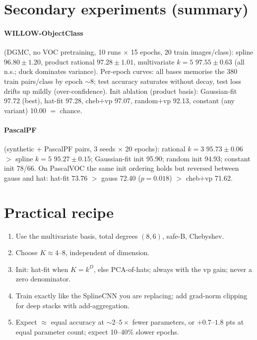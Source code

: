 \documentclass[11pt]{article}
\begin{document}
\section{Secondary experiments (summary)}
\label{sec:secondary}

\paragraph{WILLOW-ObjectClass} (DGMC, no VOC pretraining, 10 runs $\times$
15 epochs, 20 train images/class): spline $96.80 \pm 1.20$, product rational
$97.28 \pm 1.01$, multivariate $k{=}5$ $97.55 \pm 0.63$ (all n.s.; duck
dominates variance). Per-epoch curves: all bases memorise the 380 train
pairs/class by epoch ${\sim}8$; test accuracy saturates without decay, test
loss drifts up mildly (over-confidence). Init ablation (product basis):
Gaussian-fit 97.72 (best), hat-fit 97.28, cheb$+$vp 97.07, random$+$vp
92.13, constant (any variant) 10.00 $=$ chance.

\paragraph{PascalPF} (synthetic $+$ PascalPF pairs, 3 seeds $\times$ 20
epochs): rational $k{=}3$ $95.73 \pm 0.06$ $>$ spline $k{=}5$
$95.27 \pm 0.15$; Gaussian-fit init 95.90; random init 94.93; constant init
78/66. On PascalVOC the same init ordering holds but reversed between gauss
and hat: hat-fit 73.76 $>$ gauss 72.40 ($p=0.018$) $>$ cheb$+$vp 71.62.

\section{Practical recipe}
\label{sec:recipe}

\begin{enumerate}
\item Use the multivariate basis, total degrees $(8,6)$, safe-B, Chebyshev.
\item Choose $K \approx 4$--$8$, independent of dimension.
\item Init: hat-fit when $K=k^D$, else PCA-of-hats; always with the vp gain;
  never a zero denominator.
\item Train exactly like the SplineCNN you are replacing; add grad-norm
  clipping for deep stacks with add-aggregation.
\item Expect $\approx$ equal accuracy at ${\sim}2$--$5\times$ fewer
  parameters, or $+0.7$--$1.8$ pts at equal parameter count; expect
  10--40\% slower epochs.
\end{enumerate}
\end{document}

